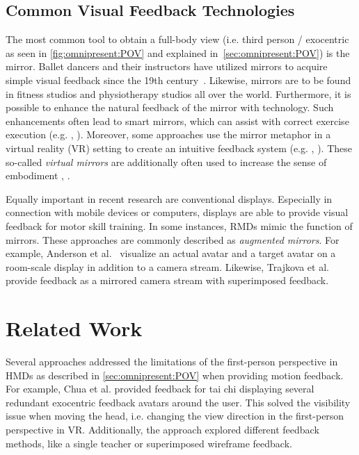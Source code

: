 \subsection{Common Visual Feedback Technologies} %
The most common tool to obtain a full-body view (i.e. third person / exocentric as seen in \autoref{fig:omnipresent:POV} and explained in~\autoref{sec:omnipresent:POV}) is the mirror. Ballet dancers and their instructors have utilized mirrors to acquire simple visual feedback since the 19th century~\cite{desmond1997mim}. Likewise, mirrors are to be found in fitness studios and physiotherapy studios all over the world. Furthermore, it is possible to enhance the natural feedback of the mirror with technology. Such enhancements often lead to smart mirrors, which can assist with correct exercise execution (e.g. \cite{kim2020rtm}, \cite{park2021ued}). Moreover, some approaches use the mirror metaphor in a virtual reality (VR) setting to create an intuitive feedback system (e.g. \cite{waltemate2016tlp}, \cite{huelsmann2019ssp}). These so-called \emph{virtual mirrors} are additionally often used to increase the sense of embodiment \cite{inoue2021virtual}, \cite{gonzalesfranco2010contribution}.

Equally important in recent research are conventional displays. Especially in connection with mobile devices or computers, displays are able to provide visual feedback for motor skill training. In some instances, RMDs mimic the function of mirrors. These approaches are commonly described as \emph{augmented mirrors}. For example, Anderson et al.~\cite{anderson2013youmove} visualize an actual avatar and a target avatar on a room-scale display in addition to a camera stream. Likewise, Trajkova et al.~\cite{trajkova2018ttb} provide feedback as a mirrored camera stream with superimposed feedback.

\section{Related Work}
Several approaches addressed the limitations of the first-person perspective in HMDs as described in \autoref{sec:omnipresent:POV} when providing motion feedback. For example, Chua et al.\cite{chua2003tpt} provided feedback for tai chi displaying several redundant exocentric feedback avatars around the user. This solved the visibility issue when moving the head, i.e. changing the view direction in the first-person perspective in VR. Additionally, the approach explored different feedback methods, like a single teacher or superimposed wireframe feedback.

